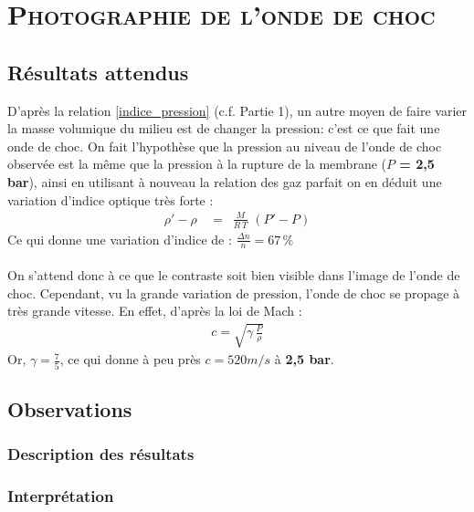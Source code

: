 \renewcommand{\chaptername}{\scshape Partie}
\chapter{\normalfont \scshape Photographie de l'onde de choc}
\section{Résultats attendus}
D’après la relation \ref{indice_pression} (c.f. Partie 1), un autre moyen de faire varier la masse volumique du milieu est de changer la pression: c’est ce que fait une onde de choc. On fait l’hypothèse que la pression au niveau de l’onde de choc observée est la même que la pression à la rupture de la membrane (\textbf{$P$ = 2,5 bar}), ainsi en utilisant à nouveau la relation des gaz parfait on en déduit une variation d’indice optique très forte  :
\begin{align}
	\rho' - \rho \,&= \,\,\,\frac{M}{R \, T}\,\,(P'-P)
\end{align}
Ce qui donne une variation d'indice de : $\frac{\Delta n}{n} = 67\,\%$\\ \\
On s'attend donc à ce que le contraste soit bien visible dans l'image de l'onde de choc. Cependant, vu la grande variation de pression, l'onde de choc se propage à très grande vitesse. En effet, d'après la loi de Mach :
\begin{align}
	c= \sqrt{\gamma\,\frac{P}{\rho}}
\end{align}
Or, \textbf{$\gamma = \frac{7}{5}$}, ce qui donne à peu près \textbf{$c=520 m/s$} à \textbf{2,5 bar}.
\section{Observations}
\subsection{Description des résultats}
\subsection{Interprétation}